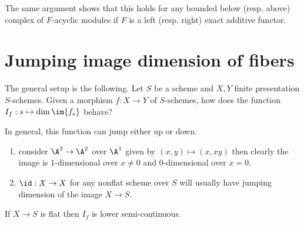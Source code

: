 \documentclass[12pt]{article}
\begin{document}
\begin{rmk}
The same argument shows that this holds for any bounded below (resp. above) complex of $F$-acyclic modules if $F$ is a left (resp. right) exact additive functor.
\end{rmk}

\section{Jumping image dimension of fibers}

The general setup is the following. Let $S$ be a scheme and $X,Y$ finite presentation $S$-schemes. Given a morphism $f : X \to Y$ of $S$-schemes, how does the function $I_f : s \mapsto \dim{\im{f_s}}$ behave?

\begin{example}
In general, this function can jump either up or down.
\begin{enumerate}
\item consider $\A^2 \to \A^2$ over $\A^1$ given by $(x,y) \mapsto (x, xy)$ then clearly the image is $1$-dimensional over $x \neq 0$ and $0$-dimensional over $x = 0$.
\item $\id : X \to X$ for any nonflat scheme over $S$ will usually have jumping dimension of the image $X \to S$. 
\end{enumerate}
\end{example}

\begin{prop}
If $X \to S$ is flat then $I_f$ is lower semi-continuous.
\end{prop}
\end{document}

